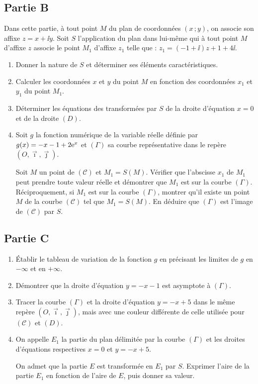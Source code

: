 \subsection*{Partie B}

Dans cette partie, à tout point $M$ du plan de coordonnées $(x\,;y)$, on associe son affixe $z = x+\ii y$.
Soit $S$ l'application du plan dans lui-même qui à tout point $M$ d'affixe $z$ associe le point $M_1$ d'affixe $z_1$ telle que : $z_1 = (-1+\ii)z + 1 + 4\ii$.

\begin{enumerate}
	\item Donner la nature de $S$ et déterminer ses éléments caractéristiques.
	\item Calculer les coordonnées $x$ et $y$ du point $M$ en fonction des coordonnées $x_1$ et $y_1$ du point $M_1$.
	\item Déterminer les équations des transformées par $S$ de la droite d'équation $x = 0$ et de la droite $(D)$.
	\item Soit $g$ la fonction numérique de la variable réelle définie par $g(x) = -x-1+2\mathrm{e}^x$ et $(\Gamma)$ sa courbe représentative dans le repère $(O,\vec{\imath},\vec{\jmath})$.

	Soit $M$ un point de $(\mathscr{C})$ et $M_1 = S(M)$. Vérifier que l'abscisse $x_1$ de $M_1$ peut prendre toute valeur réelle et démontrer que $M_1$ est sur la courbe $(\Gamma)$. Réciproquement, si $M_1$ est sur la courbe $(\Gamma)$, montrer qu'il existe un point $M$ de la courbe $(\mathscr{C})$ tel que $M_1 = S(M)$. En déduire que $(\Gamma)$ est l'image de $(\mathscr{C})$ par $S$.
\end{enumerate}

\subsection*{Partie C}

\begin{enumerate}
	\item Établir le tableau de variation de la fonction $g$ en précisant les limites de $g$ en $-\infty$ et en $+\infty$.
	\item Démontrer que la droite d'équation $y = -x-1$ est asymptote à $(\Gamma)$.
	\item Tracer la courbe $(\Gamma)$ et la droite d'équation $y = -x+5$ dans le même repère $(O,\vec{\imath},\vec{\jmath})$, mais avec une couleur différente de celle utilisée pour $(\mathscr{C})$ et $(D)$.
	\item On appelle $E_1$ la partie du plan délimitée par la courbe $(\Gamma)$ et les droites d'équations respectives $x = 0$ et $y = -x+5$.

	On admet que la partie $E$ est transformée en $E_1$ par $S$. Exprimer l'aire de la partie $E_1$ en fonction de l'aire de $E$, puis donner sa valeur.
\end{enumerate}



